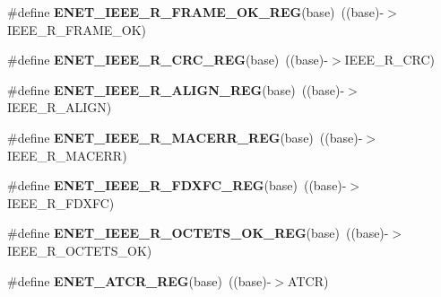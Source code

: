 \begin{DoxyCompactItemize}
\item 
\#define {\bfseries E\+N\+E\+T\+\_\+\+I\+E\+E\+E\+\_\+\+R\+\_\+\+F\+R\+A\+M\+E\+\_\+\+O\+K\+\_\+\+R\+EG}(base)~((base)-\/$>$I\+E\+E\+E\+\_\+\+R\+\_\+\+F\+R\+A\+M\+E\+\_\+\+OK)\hypertarget{group__ENET__Register__Accessor__Macros_ga26628f4b128a268c3ad7a83dd77fc7fa}{}\label{group__ENET__Register__Accessor__Macros_ga26628f4b128a268c3ad7a83dd77fc7fa}

\item 
\#define {\bfseries E\+N\+E\+T\+\_\+\+I\+E\+E\+E\+\_\+\+R\+\_\+\+C\+R\+C\+\_\+\+R\+EG}(base)~((base)-\/$>$I\+E\+E\+E\+\_\+\+R\+\_\+\+C\+RC)\hypertarget{group__ENET__Register__Accessor__Macros_ga613fb96e0af919172f1b69a978d431da}{}\label{group__ENET__Register__Accessor__Macros_ga613fb96e0af919172f1b69a978d431da}

\item 
\#define {\bfseries E\+N\+E\+T\+\_\+\+I\+E\+E\+E\+\_\+\+R\+\_\+\+A\+L\+I\+G\+N\+\_\+\+R\+EG}(base)~((base)-\/$>$I\+E\+E\+E\+\_\+\+R\+\_\+\+A\+L\+I\+GN)\hypertarget{group__ENET__Register__Accessor__Macros_ga51467d6f2f1d8d32ed1890a6403e330a}{}\label{group__ENET__Register__Accessor__Macros_ga51467d6f2f1d8d32ed1890a6403e330a}

\item 
\#define {\bfseries E\+N\+E\+T\+\_\+\+I\+E\+E\+E\+\_\+\+R\+\_\+\+M\+A\+C\+E\+R\+R\+\_\+\+R\+EG}(base)~((base)-\/$>$I\+E\+E\+E\+\_\+\+R\+\_\+\+M\+A\+C\+E\+RR)\hypertarget{group__ENET__Register__Accessor__Macros_gaae02a1de0556fcc3431991765180d28f}{}\label{group__ENET__Register__Accessor__Macros_gaae02a1de0556fcc3431991765180d28f}

\item 
\#define {\bfseries E\+N\+E\+T\+\_\+\+I\+E\+E\+E\+\_\+\+R\+\_\+\+F\+D\+X\+F\+C\+\_\+\+R\+EG}(base)~((base)-\/$>$I\+E\+E\+E\+\_\+\+R\+\_\+\+F\+D\+X\+FC)\hypertarget{group__ENET__Register__Accessor__Macros_ga1a9be5f0603c9812a67500be27884d83}{}\label{group__ENET__Register__Accessor__Macros_ga1a9be5f0603c9812a67500be27884d83}

\item 
\#define {\bfseries E\+N\+E\+T\+\_\+\+I\+E\+E\+E\+\_\+\+R\+\_\+\+O\+C\+T\+E\+T\+S\+\_\+\+O\+K\+\_\+\+R\+EG}(base)~((base)-\/$>$I\+E\+E\+E\+\_\+\+R\+\_\+\+O\+C\+T\+E\+T\+S\+\_\+\+OK)\hypertarget{group__ENET__Register__Accessor__Macros_gaa44e17cc615d26f01a3286728c456b29}{}\label{group__ENET__Register__Accessor__Macros_gaa44e17cc615d26f01a3286728c456b29}

\item 
\#define {\bfseries E\+N\+E\+T\+\_\+\+A\+T\+C\+R\+\_\+\+R\+EG}(base)~((base)-\/$>$A\+T\+CR)\hypertarget{group__ENET__Register__Accessor__Macros_ga61c2d4ab6510171bbeb84a9163f8238d}{}\label{group__ENET__Register__Accessor__Macros_ga61c2d4ab6510171bbeb84a9163f8238d}


\end{DoxyCompactItemize}
